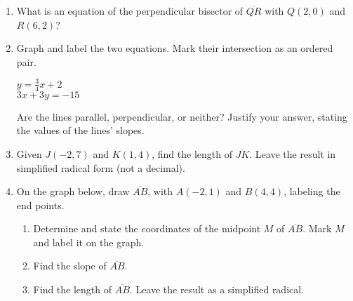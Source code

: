 \documentclass[12pt, twoside]{article}
\begin{document}
\begin{enumerate}
  \item What is an equation of the perpendicular bisector of $\overline{QR}$ with $Q(2,0)$ and $R(6,2)$? %

\newpage
\item Graph and label the two equations. Mark their intersection as an ordered pair.
  \begin{multicols}{2}
    $y = \frac{3}{4}x+2$ \\
    $3x+3y = -15$
  \end{multicols}
  \vspace{1.5cm}
    \begin{center} %
    \end{center}
  Are the lines parallel, perpendicular, or neither? Justify your answer, stating the values of the lines' slopes.

\newpage
\item Given $J(-2,7)$ and $K(1,4)$, find the length of $\overline{JK}$. Leave the result in simplified radical form (not a decimal).
    \vspace{4cm}

\item On the graph below, draw $\overline{AB}$, with $A(-2,1)$ and $B(4,4)$, labeling the end points.\\
  \begin{enumerate}
    \item Determine and state the coordinates of the midpoint $M$ of $\overline{AB}$. Mark $M$ and label it on the graph. \vspace{2cm}
    \item Find the slope of $\overline{AB}$. \vspace{2.5cm}
    \item Find the length of $\overline{AB}$. Leave the result as a simplified radical.
  \end{enumerate}


\end{enumerate}
\end{document}
